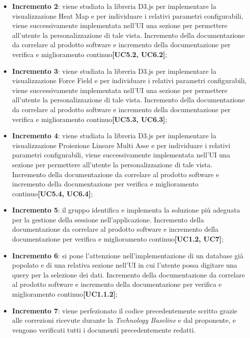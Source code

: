 \begin{itemize}
\begin{itemize}
	\item \textbf{Incremento 2}: viene studiata la libreria D3.js per implementare la visualizzazione Heat Map e per individuare i relativi parametri configurabili, viene successivamente implementata nell'UI una sezione per permettere all'utente la personalizzazione di tale vista. Incremento della documentazione da correlare al prodotto software e incremento della documentazione per verifica e miglioramento continuo\textbf{[UC5.2, UC6.2]};
	
	\item \textbf{Incremento 3}: viene studiata la libreria D3.js per implementare la visualizzazione Force Field e per individuare i relativi parametri configurabili, viene successivamente implementata nell'UI una sezione per permettere all'utente la personalizzazione di tale vista. Incremento della documentazione da correlare al prodotto software e incremento della documentazione per verifica e miglioramento continuo\textbf{[UC5.3, UC6.3]};
	
	\item \textbf{Incremento 4}: viene studiata la libreria D3.js per implementare la visualizzazione Proiezione Lineare Multi Asse e per individuare i relativi parametri configurabili, viene successivamente implementata nell'UI una sezione per permettere all'utente la personalizzazione di tale vista. Incremento della documentazione da correlare al prodotto software e incremento della documentazione per verifica e miglioramento continuo\textbf{[UC5.4, UC6.4]};
	
	\item \textbf{Incremento 5}: il gruppo identifica e implementa la soluzione più adeguata per la gestione della sessione nell'applicazione. Incremento della documentazione da correlare al prodotto software e incremento della documentazione per verifica e miglioramento continuo\textbf{[UC1.2, UC7]};
	
	\item \textbf{Incremento 6}: si pone l'attenzione nell'implementazione di un database già popolato e di una relativa sezione nell'UI in cui l'utente possa digitare una query per la selezione dei dati. Incremento della documentazione da correlare al prodotto software e incremento della documentazione per verifica e miglioramento continuo\textbf{[UC1.1.2]};
	
	\item \textbf{Incremento 7}: viene perfezionato il codice precedentemente scritto grazie alle correzioni ricevute durante la \textit{Technology Baseline} e dal proponente, e vengono verificati tutti i documenti precedentemente redatti.
	\end{itemize}
\end{itemize}

